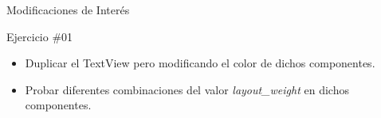 \begin{frame}{Modificaciones de Interés}

\begin{block}{Ejercicio \#01}
\begin{itemize}
\item Duplicar el TextView pero modificando el color de dichos componentes. 
\item Probar diferentes combinaciones del valor \textit{layout\_weight} en dichos componentes. 

\end{itemize}
\end{block}


\end{frame}


